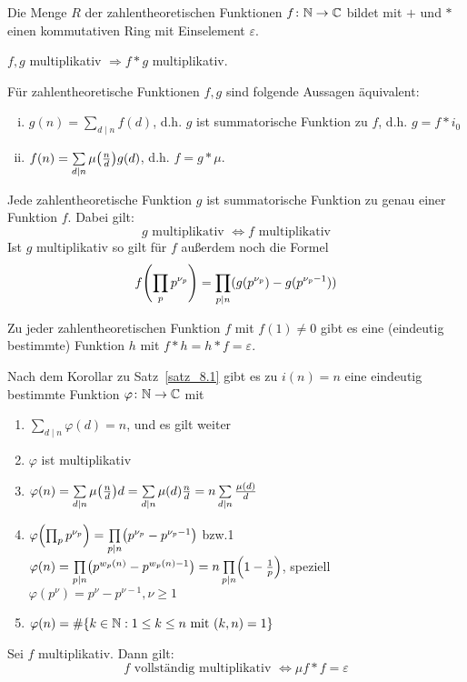 	Die Menge $R$ der zahlentheoretischen Funktionen $f \colon \mathbb{N} \rightarrow \mathbb{C}$ bildet mit $+$ und $*$ einen kommutativen Ring mit Einselement $\varepsilon$.

\begin{falko} \label{F8.5}
	$f,g$ multiplikativ $\Rightarrow f * g$ multiplikativ.
\end{falko}

\begin{satz} \label{satz_8.1}
	Für zahlentheoretische Funktionen $f,g$ sind folgende Aussagen äquivalent:  \begin{enumerate}[(i)]
		\item $g(n) = \sum\limits_{d \mid n} f(d)$, d.h. $g$ ist summatorische Funktion zu $f$, d.h. $g = f * i_0$
		\item $f(n) = \sum\limits_{d \mid n} \mu\enbrace*{\frac{n}{d}} g(d)$, d.h. $f = g * \mu$.
	\end{enumerate}
\end{satz}

	Jede zahlentheoretische Funktion $g$ ist summatorische Funktion zu genau einer Funktion $f$. Dabei gilt:
	\[ g \text{ multiplikativ } \Leftrightarrow f \text{ multiplikativ} \]
	Ist $g$ multiplikativ so gilt für $f$ außerdem noch die Formel
	\[ f \enbrace*{\prod_p p^{\nu_p}} = \prod\limits_{p \mid n} (g(p^{\nu_p}) - g(p^{\nu_p - 1})) \]
	
	Zu jeder zahlentheoretischen Funktion $f$ mit $f(1) \neq 0$ gibt es eine (eindeutig bestimmte) Funktion $h$ mit $f * h = h * f = \varepsilon$.
	
	Nach dem Korollar zu Satz~\ref{satz_8.1} gibt es zu $i(n) = n$ eine eindeutig bestimmte Funktion $\varphi\colon \mathbb{N} \rightarrow \mathbb{C}$ mit \begin{enumerate}[(1)]
		\item $\sum\limits_{d \mid n} \varphi(d) = n$, und es gilt weiter
		\item $\varphi$ ist multiplikativ
		\item $\varphi(n) = \sum\limits_{d \mid n} \mu\enbrace*{\frac{n}{d}}d = \sum\limits_{d \mid n} \mu(d) \frac{n}{d} = n \sum\limits_{d \mid n} \frac{\mu(d)}{d}$
		\item $\varphi\enbrace*{\prod_p p^{\nu_p}} = \prod\limits_{p \mid n} \enbrace*{p^{\nu_p} - p^{\nu_p - 1}}$ bzw.1
		$\varphi(n) = \prod\limits_{p \mid n} \enbrace*{p^{w_p(n)} - p^{w_p(n)-1}} = n \prod\limits_{p \mid n} \enbrace*{1 - \frac{1}{p}}$, speziell \\
		$\varphi(p^\nu) = p^\nu - p^{\nu-1}, \nu \geq 1$
		\item $\varphi(n) = \# \{k \in \mathbb{N} : 1 \leq k \leq n \text{ mit } (k,n)=1\}$
	\end{enumerate}
	
\begin{falko} \label{F8.6}
	Sei $f$ multiplikativ. Dann gilt:
	\[ f \text{ vollständig multiplikativ } \Leftrightarrow \mu f * f = \varepsilon \]
\end{falko}
\newpage